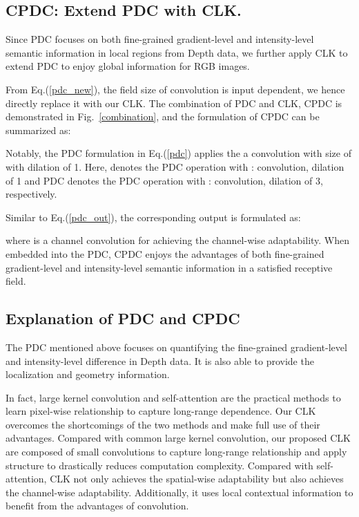 \documentclass[lettersize,journal]{IEEEtran}
\begin{document}
\subsection{CPDC: Extend PDC with CLK.}
Since PDC focuses on both fine-grained gradient-level and intensity-level semantic information in local regions from Depth data, we further apply CLK to extend PDC to enjoy global information for RGB images. 

From Eq.(\ref{pdc_new}), the field size of convolution is input dependent, we hence directly replace it with our CLK. The combination of PDC and CLK,  CPDC is demonstrated in Fig.~\ref{combination}, and the formulation of CPDC can be summarized as: 

Notably, the PDC formulation in Eq.(\ref{pdc}) applies the a convolution with size of  with dilation of 1. Here,  denotes the PDC operation with :  convolution, dilation of 1 and PDC denotes the PDC operation with :  convolution, dilation of 3, respectively.

Similar to Eq.(\ref{pdc_out}), the corresponding output is formulated as:


where  is a channel convolution for achieving the channel-wise adaptability. When embedded into the PDC, CPDC enjoys the advantages of both fine-grained gradient-level and intensity-level semantic information in a satisfied receptive field. 


\iffalse
\subsection{Explanation of PDC and CPDC}
The PDC mentioned above focuses on quantifying the fine-grained gradient-level and intensity-level difference in Depth data. It is also able to provide the localization and geometry information. 


In fact, large kernel convolution \cite{wang2017residual,hu2018gather} and self-attention \cite{wang2018non,zhu2019asymmetric,zhang2019self} are the practical methods to learn pixel-wise relationship to capture long-range dependence. Our CLK overcomes the shortcomings of the two methods and make full use of their advantages. Compared with common large kernel convolution, our proposed CLK are composed of small convolutions to capture long-range relationship and apply    structure to drastically reduces computation complexity. Compared with self-attention, CLK not only achieves the spatial-wise adaptability but also achieves the channel-wise adaptability. Additionally, it uses local contextual information to benefit from the advantages of convolution. 
\end{document}
